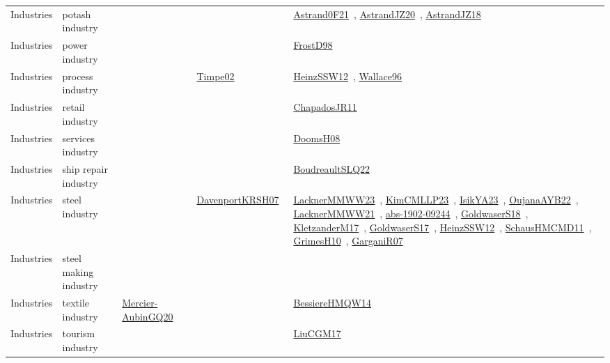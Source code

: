 {\begin{longtable}{lp{3cm}>{\raggedright\arraybackslash}p{6cm}>{\raggedright\arraybackslash}p{6cm}>{\raggedright\arraybackslash}p{8cm}}
Industries & potash industry &  &  & \href{works/Astrand0F21.pdf}{Astrand0F21}~\cite{Astrand0F21}, \href{works/AstrandJZ20.pdf}{AstrandJZ20}~\cite{AstrandJZ20}, \href{works/AstrandJZ18.pdf}{AstrandJZ18}~\cite{AstrandJZ18}\\
Industries & power industry &  &  & \href{works/FrostD98.pdf}{FrostD98}~\cite{FrostD98}\\
Industries & process industry &  & \href{works/Timpe02.pdf}{Timpe02}~\cite{Timpe02} & \href{works/HeinzSSW12.pdf}{HeinzSSW12}~\cite{HeinzSSW12}, \href{works/Wallace96.pdf}{Wallace96}~\cite{Wallace96}\\
Industries & retail industry &  &  & \href{works/ChapadosJR11.pdf}{ChapadosJR11}~\cite{ChapadosJR11}\\
Industries & services industry &  &  & \href{works/DoomsH08.pdf}{DoomsH08}~\cite{DoomsH08}\\
Industries & ship repair industry &  &  & \href{works/BoudreaultSLQ22.pdf}{BoudreaultSLQ22}~\cite{BoudreaultSLQ22}\\
Industries & steel industry &  & \href{works/DavenportKRSH07.pdf}{DavenportKRSH07}~\cite{DavenportKRSH07} & \href{works/LacknerMMWW23.pdf}{LacknerMMWW23}~\cite{LacknerMMWW23}, \href{works/KimCMLLP23.pdf}{KimCMLLP23}~\cite{KimCMLLP23}, \href{works/IsikYA23.pdf}{IsikYA23}~\cite{IsikYA23}, \href{works/OujanaAYB22.pdf}{OujanaAYB22}~\cite{OujanaAYB22}, \href{works/LacknerMMWW21.pdf}{LacknerMMWW21}~\cite{LacknerMMWW21}, \href{works/abs-1902-09244.pdf}{abs-1902-09244}~\cite{abs-1902-09244}, \href{works/GoldwaserS18.pdf}{GoldwaserS18}~\cite{GoldwaserS18}, \href{works/KletzanderM17.pdf}{KletzanderM17}~\cite{KletzanderM17}, \href{works/GoldwaserS17.pdf}{GoldwaserS17}~\cite{GoldwaserS17}, \href{works/HeinzSSW12.pdf}{HeinzSSW12}~\cite{HeinzSSW12}, \href{works/SchausHMCMD11.pdf}{SchausHMCMD11}~\cite{SchausHMCMD11}, \href{works/GrimesH10.pdf}{GrimesH10}~\cite{GrimesH10}, \href{works/GarganiR07.pdf}{GarganiR07}~\cite{GarganiR07}\\
Industries & steel making industry &  &  & \\
Industries & textile industry & \href{works/Mercier-AubinGQ20.pdf}{Mercier-AubinGQ20}~\cite{Mercier-AubinGQ20} &  & \href{works/BessiereHMQW14.pdf}{BessiereHMQW14}~\cite{BessiereHMQW14}\\
Industries & tourism industry &  &  & \href{works/LiuCGM17.pdf}{LiuCGM17}~\cite{LiuCGM17}\\
\end{longtable}
}

